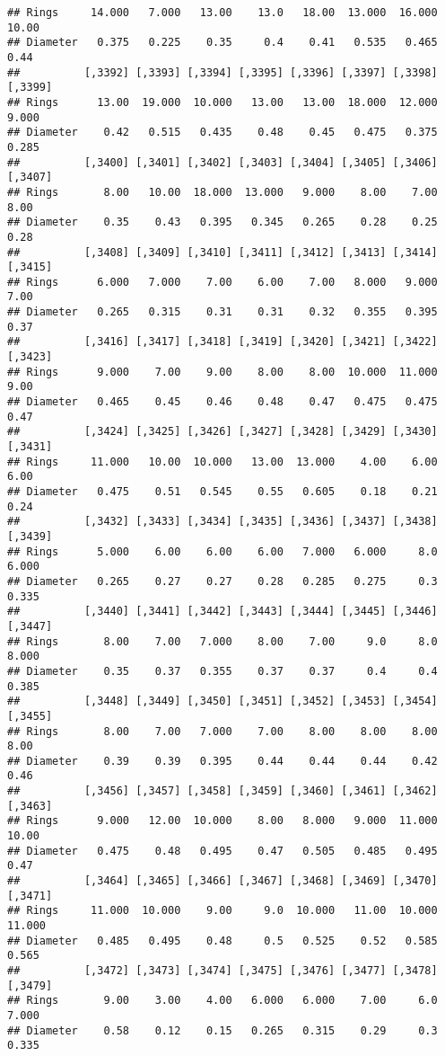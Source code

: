 \documentclass[
]{article}
\begin{document}
\begin{verbatim}
## Rings     14.000   7.000   13.00    13.0   18.00  13.000  16.000   10.00
## Diameter   0.375   0.225    0.35     0.4    0.41   0.535   0.465    0.44
##          [,3392] [,3393] [,3394] [,3395] [,3396] [,3397] [,3398] [,3399]
## Rings      13.00  19.000  10.000   13.00   13.00  18.000  12.000   9.000
## Diameter    0.42   0.515   0.435    0.48    0.45   0.475   0.375   0.285
##          [,3400] [,3401] [,3402] [,3403] [,3404] [,3405] [,3406] [,3407]
## Rings       8.00   10.00  18.000  13.000   9.000    8.00    7.00    8.00
## Diameter    0.35    0.43   0.395   0.345   0.265    0.28    0.25    0.28
##          [,3408] [,3409] [,3410] [,3411] [,3412] [,3413] [,3414] [,3415]
## Rings      6.000   7.000    7.00    6.00    7.00   8.000   9.000    7.00
## Diameter   0.265   0.315    0.31    0.31    0.32   0.355   0.395    0.37
##          [,3416] [,3417] [,3418] [,3419] [,3420] [,3421] [,3422] [,3423]
## Rings      9.000    7.00    9.00    8.00    8.00  10.000  11.000    9.00
## Diameter   0.465    0.45    0.46    0.48    0.47   0.475   0.475    0.47
##          [,3424] [,3425] [,3426] [,3427] [,3428] [,3429] [,3430] [,3431]
## Rings     11.000   10.00  10.000   13.00  13.000    4.00    6.00    6.00
## Diameter   0.475    0.51   0.545    0.55   0.605    0.18    0.21    0.24
##          [,3432] [,3433] [,3434] [,3435] [,3436] [,3437] [,3438] [,3439]
## Rings      5.000    6.00    6.00    6.00   7.000   6.000     8.0   6.000
## Diameter   0.265    0.27    0.27    0.28   0.285   0.275     0.3   0.335
##          [,3440] [,3441] [,3442] [,3443] [,3444] [,3445] [,3446] [,3447]
## Rings       8.00    7.00   7.000    8.00    7.00     9.0     8.0   8.000
## Diameter    0.35    0.37   0.355    0.37    0.37     0.4     0.4   0.385
##          [,3448] [,3449] [,3450] [,3451] [,3452] [,3453] [,3454] [,3455]
## Rings       8.00    7.00   7.000    7.00    8.00    8.00    8.00    8.00
## Diameter    0.39    0.39   0.395    0.44    0.44    0.44    0.42    0.46
##          [,3456] [,3457] [,3458] [,3459] [,3460] [,3461] [,3462] [,3463]
## Rings      9.000   12.00  10.000    8.00   8.000   9.000  11.000   10.00
## Diameter   0.475    0.48   0.495    0.47   0.505   0.485   0.495    0.47
##          [,3464] [,3465] [,3466] [,3467] [,3468] [,3469] [,3470] [,3471]
## Rings     11.000  10.000    9.00     9.0  10.000   11.00  10.000  11.000
## Diameter   0.485   0.495    0.48     0.5   0.525    0.52   0.585   0.565
##          [,3472] [,3473] [,3474] [,3475] [,3476] [,3477] [,3478] [,3479]
## Rings       9.00    3.00    4.00   6.000   6.000    7.00     6.0   7.000
## Diameter    0.58    0.12    0.15   0.265   0.315    0.29     0.3   0.335

\end{verbatim}
\end{document}
